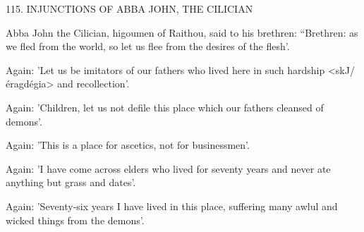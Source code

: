 115.
INJUNCTIONS OF ABBA JOHN, THE CILICIAN

Abba John the Cilician, higoumen of Raithou, said to his brethren:
“Brethren: as we fled from the world, so let us flee from the desires
of the flesh'.

Again: 'Let us be imitators of our fathers who lived here in such
hardship <skJ/éragdégia> and recollection'.

Again: 'Children, let us not defile this place which our fathers
cleansed of demons'.

Again: 'This is a place for ascetics, not for businessmen'.

Again: 'I have come across elders who lived for seventy years
and never ate anything but grass and dates'.

Again: 'Seventy-six years I have lived in this place, suffering
many awlul and wicked things from the demons'.

